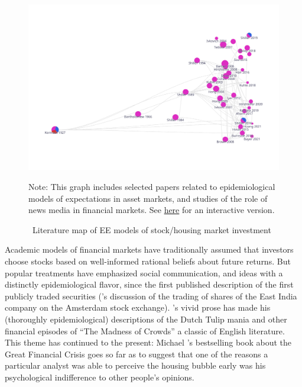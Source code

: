 


\begin{figure}[!ht] \centering  %
  \caption{ ~Literature map of EE models of stock/housing market investment}
  \label{fig:graph_investment}
  \includegraphics[width=\textwidth]{./figures/graph_investment}
  \begin{flushleft}
    {\footnotesize Note: This graph includes selected papers related to epidemiological models of expectations in asset markets, and studies of the role of news media in financial markets. See \href{https://app.litmaps.co/shared/E25276CA-8725-437B-8241-11961EFB3FB4}{here} for an interactive version.}
  \end{flushleft}
\end{figure}

Academic models of financial markets have traditionally assumed that investors choose stocks based on well-informed rational beliefs about future returns.  But popular treatments have emphasized social communication, and ideas with a distinctly epidemiological flavor, since the first published description of  the first publicly traded securities (\cite{vegaConfusion}'s discussion of the trading of shares of the East India company on the Amsterdam stock exchange).  \cite{mackay1850memoirs}'s vivid prose has made his (thoroughly epidemiological) descriptions of the Dutch Tulip mania and other financial episodes of ``The Madness of Crowds'' a classic of English literature.  This theme has continued to the present: Michael \cite{lewis2011big}'s bestselling book about the Great Financial Crisis goes so far as to suggest that one of the reasons a particular analyst was able to perceive the housing bubble early was his psychological indifference to other people's opinions.

